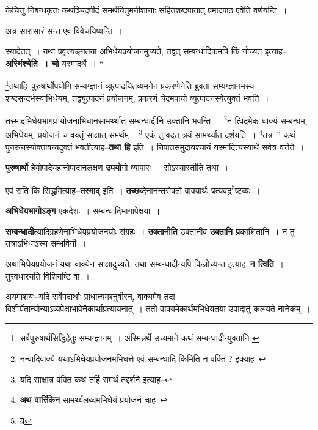 \documentclass[article,12pt,a4paper]{memoir}
\begin{document}
	  \pstart केचित्तु निबन्धकृतः कथञ्चिदपीदं समर्थयितुमनीशानाः सहितशब्दपातात् प्रमादपाठ एवेति वर्णयन्ति ।
	\pend
      

	  \pstart अत्र सारासारं सन्त एव विवेचयिष्यन्ति ।
	\pend
      

	  \pstart स्यादेतत् । यथा प्रवृत्त्यङ्गतया अभिधेयप्रयोजनमुच्यते, तद्वत् सम्बन्धादिकमपि किं नोच्यत इत्याह--\textbf{अस्मिंश्चेति । चो} यस्मादर्थे ।  \leavevmode{} “
	  
	\footnote{सर्वपुरुषार्थसिद्धिहेतुः सम्यग्ज्ञानम् । अस्मिन्नर्थे उच्यमाने कथं सम्बन्धादीन्युक्तानि-\cite{dp-msD-n}}तथाहि--पुरुषार्थोपयोगि सम्यग्ज्ञानं व्युत्पादयितव्यमनेन प्रकरणेनेति ब्रुवता सम्यग्ज्ञानमस्य शब्दसन्दर्भस्याभिधेयम्, तद्व्युत्पादनं प्रयोजनम्, प्रकरणं चेदमपायो व्युत्पादनस्येत्युक्तं भवति । 
	  
	तस्मादभिधेयभागप्र योजनाभिधानसामर्थ्थात् सम्बन्धादीनि उक्तानि भवन्ति । \footnote{नन्वादिवाक्ये यथाऽभिधेयप्रयोजनमभिधत्ते एवं सम्बन्धादि किमिति न वक्ति ? इक्याह--\cite{dp-msD-n}}न त्विदमेकं धाक्यं सम्बन्धम्, अभिधेयम्, प्रयोजनं च वक्तुं साक्षात् समर्थम् ।\footnote{यदि साक्षान्न वक्ति कथं तर्हि समर्थं तद्दर्शने इत्याह--\cite{dp-msD-n}} एकं तु वदत् त्रयं सामर्थ्यात् दर्शयति । \footnote{\textbf{अथ वार्त्तिकेन} सामर्थ्यलब्धमभिधेयं प्रयोजनं चाह--\cite{dp-msD-n}}तत्र--” कथं पुनरन्यस्योक्तावन्यदुक्तं भवतीत्याह--\textbf{तथा हि} इति । निपातसमुदायश्चायं यस्मादित्यस्यार्थे सर्वत्र वर्त्तते ।
	\pend
      

	  \pstart \textbf{पुरुषार्थो} हेयोपादेयहानोपादानलक्षण \textbf{उपयो}गो व्यापारः । सोऽस्यास्तीति तथा ।
	\pend
      

	  \pstart एवं सति किं सिद्धमित्याह--\textbf{तस्माद्} इति । \textbf{तच्छ}ब्देनानन्तरोक्तो वाक्यार्थः प्रत्यवद्र\footnote{म्र}ष्टव्यः ।
	\pend
      

	  \pstart \textbf{अभिधेयभागोऽङ्ग} एकदेशः । सम्बन्धादिभागापेक्षया ।
	\pend
      

	  \pstart \textbf{सम्बन्धादी}त्यादिग्रहणेनाभिधेयप्रयोजनयोः संग्रहः । \leavevmode{} \textbf{उक्तानीति} उक्तानीव \textbf{उक्तानि प्र}काशितानि । न तु तत्राऽभिधाऽस्य सम्भविनी ।
	\pend
      

	  \pstart अथाभिधेयप्रयोजनं यथा वाक्येन साक्षादुच्यते, तथा सम्बन्धादीन्यपि किन्नोच्यन्त इत्याह--\textbf{न त्विति} । तुरवधारयति विशिनष्टि वा ।
	\pend
      

	  \pstart अयमाशयः--यदि सर्वेपदार्थाः प्राधान्यमश्नुवीरन्, वाक्यमेव तदा विशीर्येतान्योन्याऽव्यपेक्षाभावेनैकार्थाप्रत्यायनात् । ततो वाक्यमेकार्थमभिधेयतया उपादातुं कल्प्यते नानेकम् ।
	\pend
      
\end{document}
